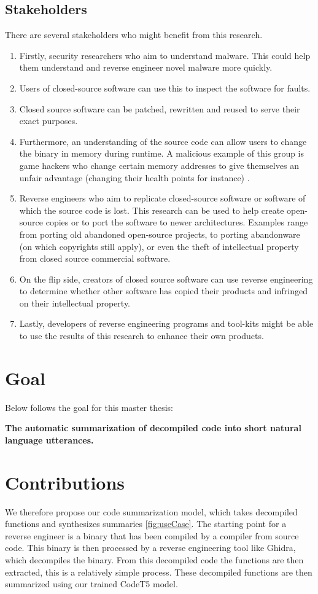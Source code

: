 \subsection{Stakeholders}
There are several stakeholders who might benefit from this research. 
\begin{enumerate}
    \item Firstly, security researchers who aim to understand malware. This could help them understand and reverse engineer novel malware more quickly.
    \item Users of closed-source software can use this to inspect the software for faults.
    \item Closed source software can be patched, rewritten and reused to serve their exact purposes.
    \item Furthermore, an understanding of the source code can allow users to change the binary in memory during runtime. A malicious example of this group is game hackers who change certain memory addresses to give themselves an unfair advantage (changing their health points for instance) \cite{TypeInferenceSurvey}. 
    \item Reverse engineers who aim to replicate closed-source software or software of which the source code is lost. This research can be used to help create open-source copies or to port the software to newer architectures. Examples range from porting old abandoned open-source projects, to porting abandonware (on which copyrights still apply), or even the theft of intellectual property from closed source commercial software.
    \item On the flip side, creators of closed source software can use reverse engineering to determine whether other software has copied their products and infringed on their intellectual property.
    \item Lastly, developers of reverse engineering programs and tool-kits might be able to use the results of this research to enhance their own products. 
\end{enumerate}

\section{Goal}
Below follows the goal for this master thesis:\\

\centerline{\textbf{The automatic summarization of decompiled code into short natural language utterances.}}

\section{Contributions}
We therefore propose our code summarization model, which takes decompiled functions and synthesizes summaries \ref{fig:useCase}. The starting point for a reverse engineer is a binary that has been compiled by a compiler from source code. This binary is then processed by a reverse engineering tool like Ghidra, which decompiles the binary. From this decompiled code the functions are then extracted, this is a relatively simple process. These decompiled functions are then summarized using our trained CodeT5 \cite{CodeT5} model.

